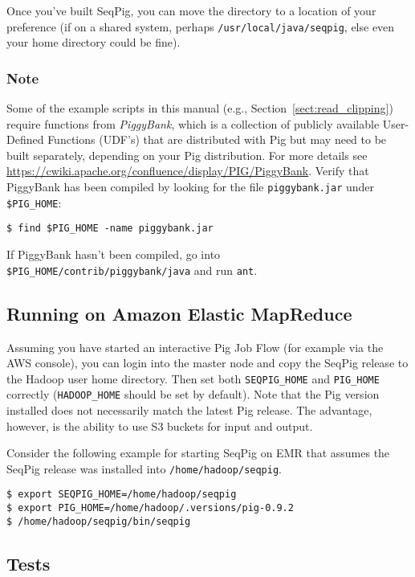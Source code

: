 Once you've built SeqPig, you can move the directory to a location of your
preference (if on a shared system, perhaps {\tt /usr/local/java/seqpig}, else
even your home directory could be fine).

\subsubsection{Note}
\label{sect:piggybank_note}

Some of the example scripts in this manual (e.g.,
Section~\ref{sect:read_clipping}) require functions from \emph{PiggyBank},
which is a collection of publicly available User-Defined Functions (UDF's)
that are distributed with Pig but may need to be built separately, depending on
your Pig distribution.
For more details see
\url{https://cwiki.apache.org/confluence/display/PIG/PiggyBank}. Verify that
PiggyBank has been compiled by looking for the file {\tt piggybank.jar} under
{\tt \$PIG\_HOME}:
\begin{lstlisting} 
$ find $PIG_HOME -name piggybank.jar
\end{lstlisting}
If PiggyBank hasn't been compiled, go into {\tt
\$PIG\_HOME/contrib/piggybank/java} and run {\tt ant}.

\subsection{Running on Amazon Elastic MapReduce}

Assuming you have started an interactive Pig Job Flow (for example via
the AWS console), you can login into the master node and copy the SeqPig release to the Hadoop
user home directory. Then set both {\tt SEQPIG\_HOME} and {\tt PIG\_HOME}
correctly ({\tt HADOOP\_HOME} should be set by default). Note that the
Pig version installed does not necessarily match the latest Pig release.
The advantage, however, is the ability to use S3 buckets for input and
output.

Consider the following example for starting SeqPig on EMR that assumes the SeqPig release was installed
into {\tt /home/hadoop/seqpig}.
\begin{lstlisting} 
$ export SEQPIG_HOME=/home/hadoop/seqpig
$ export PIG_HOME=/home/hadoop/.versions/pig-0.9.2
$ /home/hadoop/seqpig/bin/seqpig
\end{lstlisting}

\subsection{Tests}

